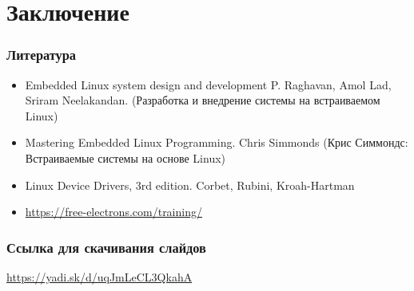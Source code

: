 \section{Заключение}
\begin{frame}
  \frametitle{Литература}
  \begin{itemize}
    \item  Embedded Linux system design and development  P. Raghavan, Amol Lad, Sriram Neelakandan. (Разработка и внедрение системы на встраиваемом Linux)
    \item Mastering Embedded Linux Programming. Chris Simmonds (Крис Симмондс: Встраиваемые системы на основе Linux)
    \item Linux Device Drivers, 3rd edition. Corbet, Rubini, Kroah-Hartman 
    \item \url{https://free-electrons.com/training/}
  \end{itemize}
\end{frame}

\begin{frame}
  \frametitle{Ссылка для скачивания слайдов}
  \begin{center}
    \url{https://yadi.sk/d/uqJmLeCL3QkahA}
  \end{center}
\end{frame}


